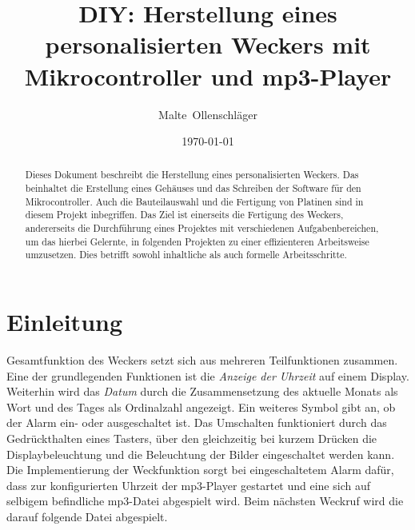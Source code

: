 \documentclass[journal, a4paper]{IEEEtran}
\date{\today}
\author{Malte~Ollenschläger}
\title{DIY: Herstellung eines personalisierten Weckers mit Mikrocontroller und mp3-Player}
\begin{document}
\maketitle
\begin{abstract}
	Dieses Dokument beschreibt die Herstellung eines personalisierten Weckers. Das beinhaltet die Erstellung eines Gehäuses und das Schreiben der Software für den Mikrocontroller. Auch die Bauteilauswahl und die Fertigung von Platinen sind in diesem Projekt inbegriffen. Das Ziel ist einerseits die Fertigung des Weckers, andererseits die Durchführung eines Projektes mit verschiedenen Aufgabenbereichen, um das hierbei Gelernte, in folgenden Projekten zu einer effizienteren Arbeitsweise umzusetzen. Dies betrifft sowohl inhaltliche als auch formelle Arbeitsschritte.
\end{abstract}


\section{Einleitung}
	 Gesamtfunktion des Weckers setzt sich aus mehreren Teilfunktionen zusammen. Eine der grundlegenden Funktionen ist die \textit{Anzeige der Uhrzeit} auf einem Display. Weiterhin wird das \textit{Datum} durch die Zusammensetzung des aktuelle Monats als Wort und des Tages als Ordinalzahl angezeigt. %
	Ein weiteres Symbol gibt an, ob der Alarm ein- oder ausgeschaltet ist. Das Umschalten funktioniert durch das Gedrückthalten eines Tasters, über den gleichzeitig bei kurzem Drücken die Displaybeleuchtung und die Beleuchtung der Bilder eingeschaltet werden kann. Die Implementierung der Weckfunktion sorgt bei eingeschaltetem Alarm dafür, dass zur konfigurierten Uhrzeit der mp3-Player gestartet und eine sich auf selbigem befindliche mp3-Datei abgespielt wird. Beim nächsten Weckruf wird die darauf folgende Datei abgespielt.\par
\end{document}
